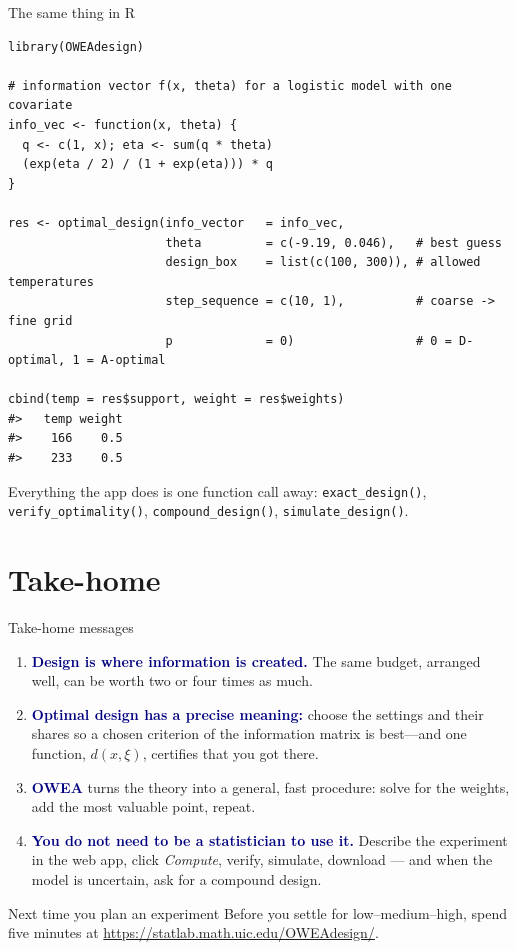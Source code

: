 \documentclass[aspectratio=169,10pt]{beamer}
\newcommand{\key}[1]{\textcolor{navy}{\textbf{#1}}}
\begin{document}
\begin{frame}[fragile]{The same thing in R}
\begin{lstlisting}
library(OWEAdesign)

# information vector f(x, theta) for a logistic model with one covariate
info_vec <- function(x, theta) {
  q <- c(1, x); eta <- sum(q * theta)
  (exp(eta / 2) / (1 + exp(eta))) * q
}

res <- optimal_design(info_vector   = info_vec,
                      theta         = c(-9.19, 0.046),   # best guess
                      design_box    = list(c(100, 300)), # allowed temperatures
                      step_sequence = c(10, 1),          # coarse -> fine grid
                      p             = 0)                 # 0 = D-optimal, 1 = A-optimal

cbind(temp = res$support, weight = res$weights)
#>   temp weight
#>    166    0.5
#>    233    0.5
\end{lstlisting}
\vspace{-0.3em}
{\footnotesize Everything the app does is one function call away: \texttt{exact\_design()}, \texttt{verify\_optimality()}, \texttt{compound\_design()}, \texttt{simulate\_design()}.}
\end{frame}

\section{Take-home}

\begin{frame}{Take-home messages}
  \begin{enumerate}
    \item \key{Design is where information is created.} The same budget, arranged well, can be worth two or four times as much.
    \item \key{Optimal design has a precise meaning:} choose the settings and their shares so a chosen criterion of the
          information matrix is best---and one function, $d(x,\xi)$, certifies that you got there.
    \item \key{OWEA} turns the theory into a general, fast procedure: solve for the weights, add the most valuable point, repeat.
    \item \key{You do not need to be a statistician to use it.} Describe the experiment in the web app, click \emph{Compute},
          verify, simulate, download --- and when the model is uncertain, ask for a compound design.
  \end{enumerate}
  \vspace{0.8em}
  \begin{alertblock}{Next time you plan an experiment}
    Before you settle for low--medium--high, spend five minutes at \url{https://statlab.math.uic.edu/OWEAdesign/}.
  \end{alertblock}
\end{frame}
\end{document}

